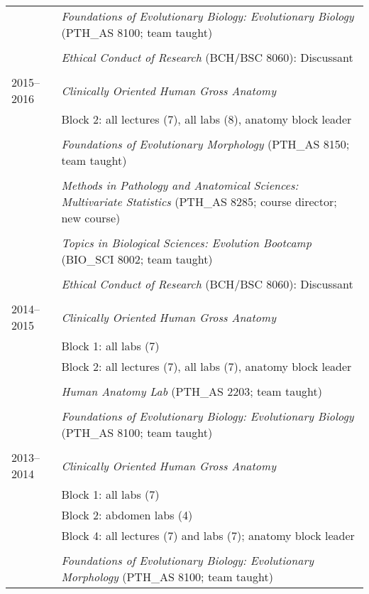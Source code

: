 \begin{longtable}{@{}lX@{}}
    \\
    & \textit{Foundations of Evolutionary Biology: Evolutionary Biology} (PTH\_AS 8100; team taught)\\
    \\
    & \textit{Ethical Conduct of Research} (BCH/BSC 8060): Discussant\\
    \\
  2015--2016 & \textit{Clinically Oriented Human Gross Anatomy}\\
    & Block 2: all lectures (7), all labs (8), anatomy block leader\\
    \\
    & \textit{Foundations of Evolutionary Morphology} (PTH\_AS 8150; team taught)\\
    \\
    & \textit{Methods in Pathology and Anatomical Sciences: Multivariate Statistics} (PTH\_AS 8285; course director; new course)\\
    \\
    & \textit{Topics in Biological Sciences: Evolution Bootcamp} (BIO\_SCI 8002; team taught)\\
    \\
    & \textit{Ethical Conduct of Research} (BCH/BSC 8060): Discussant\\
    \\
  2014--2015& \textit{Clinically Oriented Human Gross Anatomy}\\
    & Block 1: all labs (7)\\
    & Block 2: all lectures (7), all labs (7), anatomy block leader\\
    \\
    & \textit{Human Anatomy Lab} (PTH\_AS 2203; team taught)\\
    \\
    & \textit{Foundations of Evolutionary Biology: Evolutionary Biology} (PTH\_AS 8100; team taught)\\
    \\
  2013--2014 & \textit{Clinically Oriented Human Gross Anatomy}\\
    & Block 1: all labs (7)\\
    & Block 2: abdomen labs (4)\\
    & Block 4: all lectures (7) and labs (7); anatomy block leader\\
    \\
    & \textit{Foundations of Evolutionary Biology: Evolutionary Morphology} (PTH\_AS 8100; team taught)\\

\end{longtable}
